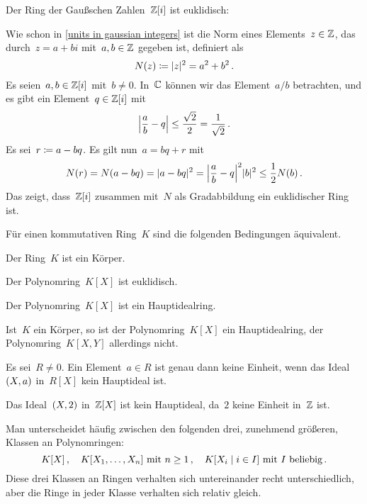 \begin{example}
  Der Ring der Gaußschen Zahlen~$\Integer[i]$ ist euklidisch:

  Wie schon in \cref{units in gaussian integers} ist die Norm eines Elements~$z \in \Integer$, das durch~$z = a + bi$ mit~$a, b \in \Integer$ gegeben ist, definiert als
  \[
    N(z)
    \defined
    \abs{z}^2
    =
    a^2 + b^2 \,.
  \]
  Es seien~$a, b \in \Integer[i]$ mit~$b \neq 0$.
  In~$\Complex$ können wir das Element~$a/b$ betrachten, und es gibt ein Element~$q \in \Integer[i]$ mit
  \[
    \abs*{ \frac{a}{b} - q }
    \leq
    \frac{\sqrt{2}}{2}
    =
    \frac{1}{\sqrt{2}} \,.
  \]
  Es sei~$r \defined a - bq$.
  Es gilt nun~$a = bq + r$ mit
  \[
    N(r)
    =
    N(a - bq)
    =
    \abs{a-bq}^2
    =
    \abs*{ \frac{a}{b} - q }^2 \abs{b}^2
    \leq
    \frac{1}{2} N(b) \,.
  \]
  Das zeigt, dass~$\Integer[i]$ zusammen mit~$N$ als Gradabbildung ein euklidischer Ring ist.
\end{example}

\begin{proposition}
  Für einen kommutativen Ring~$K$ sind die folgenden Bedingungen äquivalent.
  \begin{equivlist}
    \item
      Der Ring~$K$ ist ein Körper.
    \item
      Der Polynomring~$K[X]$ ist euklidisch.
    \item
      Der Polynomring~$K[X]$ ist ein Hauptidealring.
  \end{equivlist}
\end{proposition}

\begin{example}
  Ist~$K$ ein Körper, so ist der Polynomring~$K[X]$ ein Hauptidealring, der Polynomring~$K[X,Y]$ allerdings nicht.
\end{example}

\begin{remark}
  Es sei~$R \neq 0$.
  Ein Element~$a \in R$ ist genau dann keine Einheit, wenn das Ideal~$\genideal{X, a}$ in~$R[X]$ kein Hauptideal ist.
\end{remark}

\begin{example}
  Das Ideal~$\genideal{X, 2}$ in~$\Integer[X]$ ist kein Hauptideal, da~$2$ keine Einheit in~$\Integer$ ist.
\end{example}

\begin{remark}
  Man unterscheidet häufig zwischen den folgenden drei, zunehmend größeren, Klassen an Polynomringen:
  \[
    K[X] \,,
    \quad
    \text{$K[X_1, \dotsc, X_n]$ mit~$n \geq 1$} \,,
    \quad
    \text{$K[X_i \suchthat i \in I]$ mit~$I$ beliebig} \,.
  \]
  Diese drei Klassen an Ringen verhalten sich untereinander recht unterschiedlich, aber die Ringe in jeder Klasse verhalten sich relativ gleich.
\end{remark}





